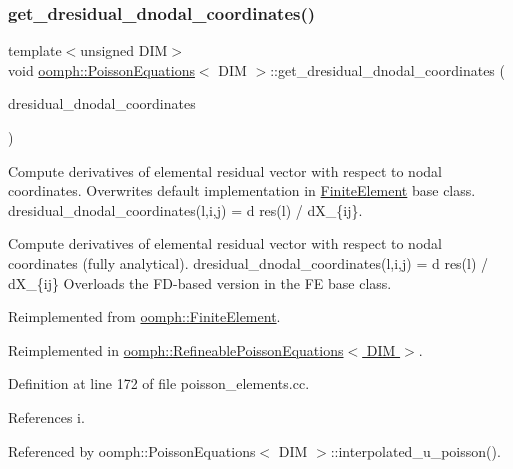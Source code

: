 \subsubsection{\texorpdfstring{get\+\_\+dresidual\+\_\+dnodal\+\_\+coordinates()}{get\_dresidual\_dnodal\_coordinates()}}
{\footnotesize\ttfamily template$<$unsigned D\+IM$>$ \\
void \hyperlink{classoomph_1_1PoissonEquations}{oomph\+::\+Poisson\+Equations}$<$ D\+IM $>$\+::get\+\_\+dresidual\+\_\+dnodal\+\_\+coordinates (\begin{DoxyParamCaption}\item[{\hyperlink{classoomph_1_1RankThreeTensor}{Rank\+Three\+Tensor}$<$ double $>$ \&}]{dresidual\+\_\+dnodal\+\_\+coordinates }\end{DoxyParamCaption})\hspace{0.3cm}{\ttfamily [virtual]}}



Compute derivatives of elemental residual vector with respect to nodal coordinates. Overwrites default implementation in \hyperlink{classoomph_1_1FiniteElement}{Finite\+Element} base class. dresidual\+\_\+dnodal\+\_\+coordinates(l,i,j) = d res(l) / d\+X\+\_\+\{ij\}. 

Compute derivatives of elemental residual vector with respect to nodal coordinates (fully analytical). dresidual\+\_\+dnodal\+\_\+coordinates(l,i,j) = d res(l) / d\+X\+\_\+\{ij\} Overloads the F\+D-\/based version in the FE base class. 

Reimplemented from \hyperlink{classoomph_1_1FiniteElement_ae4b85a31a983a52d3010930f9e0851b8}{oomph\+::\+Finite\+Element}.



Reimplemented in \hyperlink{classoomph_1_1RefineablePoissonEquations_a1cb1cf52a2332954f69199c7e0c219b4}{oomph\+::\+Refineable\+Poisson\+Equations$<$ D\+I\+M $>$}.



Definition at line 172 of file poisson\+\_\+elements.\+cc.



References i.



Referenced by oomph\+::\+Poisson\+Equations$<$ D\+I\+M $>$\+::interpolated\+\_\+u\+\_\+poisson().

\mbox{\label{classoomph_1_1PoissonEquations_aa11374daca090943d5abc70fa73cc763}} 
